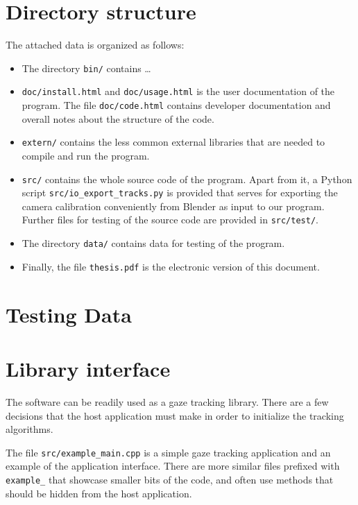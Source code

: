 
\setcounter{section}{0}
\renewcommand{\thesection}{\Alph{section}}

\section{Directory structure}
\label{s:dirstructure}

The attached data is organized as follows:

\begin{itemize}
\item The directory {\tt bin/} contains \dots

\item {\tt doc/install.html} and {\tt doc/usage.html} is the user documentation of the program.
The file {\tt doc/code.html} contains developer documentation and overall notes about the structure of the code.

\item {\tt extern/} contains the less common external libraries that are needed to compile and run the program.

\item {\tt src/} contains the whole source code of the program.
Apart from it, a Python script {\tt src/io\_export\_tracks.py} is provided that serves for exporting the camera calibration conveniently from Blender as input to our program.
Further files for testing of the source code are provided in {\tt src/test/}.

\item The directory {\tt data/} contains data for testing of the program.

\item Finally, the file {\tt thesis.pdf} is the electronic version of this document.

\end{itemize}

\section{Testing Data}

\todo{\dots}

\section{Library interface}

The software can be readily used as a gaze tracking library.
There are a few decisions that the host application must make in order to initialize the tracking algorithms.
\todo{\dots}

The file {\tt src/example\_main.cpp} is a simple gaze tracking application and an example of the application interface.
There are more similar files prefixed with {\tt example\_} that showcase smaller bits of the code, and often use methods that should be hidden from the host application.
